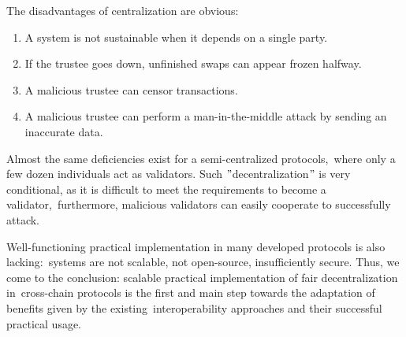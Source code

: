 The disadvantages of centralization are obvious:
\begin{enumerate}
    \item A system is not sustainable when it depends on a single party.
    \item If the trustee goes down, unfinished swaps can appear frozen halfway.
    \item A malicious trustee can censor transactions.
    \item A malicious trustee can perform a man-in-the-middle attack by sending an inaccurate data.
\end{enumerate}
Almost the same deficiencies exist for a semi-centralized protocols,\
where only a few dozen individuals act as validators.
Such \("\)decentralization\("\) is very conditional, as it is difficult to meet the requirements to become a validator,\
furthermore, malicious validators can easily cooperate to successfully attack.

Well-functioning practical implementation in many developed protocols is also lacking:\
systems are not scalable, not open-source, insufficiently secure.
Thus, we come to the conclusion: scalable practical implementation of fair decentralization in\
cross-chain protocols is the first and main step towards the adaptation of benefits given by the existing\
interoperability approaches and their successful practical usage.